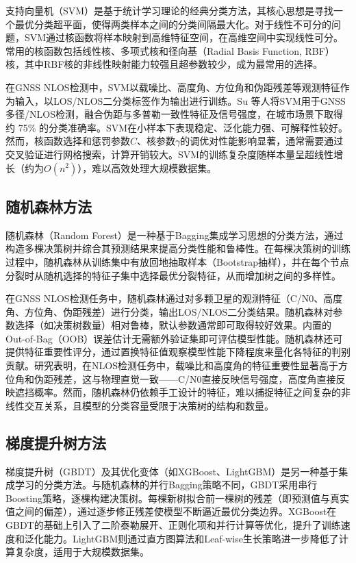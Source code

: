     支持向量机（SVM）是基于统计学习理论的经典分类方法，其核心思想是寻找一个最优分类超平面，使得两类样本之间的分类间隔最大化。对于线性不可分的问题，SVM通过核函数将样本映射到高维特征空间，在高维空间中实现线性可分。常用的核函数包括线性核、多项式核和径向基（Radial Basis Function, RBF）核，其中RBF核的非线性映射能力较强且超参数较少，成为最常用的选择。

    在GNSS NLOS检测中，SVM以载噪比、高度角、方位角和伪距残差等观测特征作为输入，以LOS/NLOS二分类标签作为输出进行训练。Su 等人\cite{su2022nlos}将SVM用于GNSS多径/NLOS检测，融合伪距与多普勒一致性特征及信号强度，在城市场景下取得约 75\% 的分类准确率。SVM在小样本下表现稳定、泛化能力强、可解释性较好。然而，核函数选择和惩罚参数$C$、核参数$\gamma$的调优对性能影响显著，通常需要通过交叉验证进行网格搜索，计算开销较大。SVM的训练复杂度随样本量呈超线性增长（约为$O(n^2)$），难以高效处理大规模数据集。

\subsection{随机森林方法}

    随机森林（Random Forest）是一种基于Bagging集成学习思想的分类方法，通过构造多棵决策树并综合其预测结果来提高分类性能和鲁棒性。在每棵决策树的训练过程中，随机森林从训练集中有放回地抽取样本（Bootstrap抽样），并在每个节点分裂时从随机选择的特征子集中选择最优分裂特征，从而增加树之间的多样性。

    在GNSS NLOS检测任务中，随机森林通过对多颗卫星的观测特征（C/N0、高度角、方位角、伪距残差）进行分类，输出LOS/NLOS二分类结果。随机森林对参数选择（如决策树数量）相对鲁棒，默认参数通常即可取得较好效果。内置的Out-of-Bag（OOB）误差估计无需额外验证集即可评估模型性能。随机森林还可提供特征重要性评分，通过置换特征值观察模型性能下降程度来量化各特征的判别贡献。研究表明，在NLOS检测任务中，载噪比和高度角的特征重要性显著高于方位角和伪距残差，这与物理直觉一致——C/N0直接反映信号强度，高度角直接反映遮挡概率。然而，随机森林仍依赖手工设计的特征，难以捕捉特征之间复杂的非线性交互关系，且模型的分类容量受限于决策树的结构和数量。

\subsection{梯度提升树方法}

    梯度提升树（GBDT）及其优化变体（如XGBoost、LightGBM）是另一种基于集成学习的分类方法。与随机森林的并行Bagging策略不同，GBDT采用串行Boosting策略，逐棵构建决策树。每棵新树拟合前一棵树的残差（即预测值与真实值之间的偏差），通过逐步修正残差使模型不断逼近最优分类边界。XGBoost在GBDT的基础上引入了二阶泰勒展开、正则化项和并行计算等优化，提升了训练速度和泛化能力。LightGBM则通过直方图算法和Leaf-wise生长策略进一步降低了计算复杂度，适用于大规模数据集。

